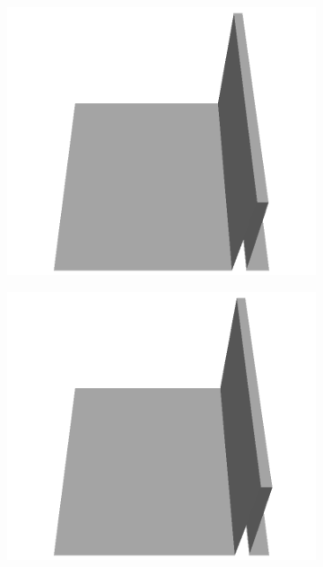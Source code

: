 \documentclass[../document.tex]{subfiles}
\begin{document}
\begin{figure}[H]
\begin{subfigure}[b]{0.065\textwidth}
    \includegraphics[width=\linewidth]{../img/5/custom_patches/walls_front/all/17-3d.png}
    \end{subfigure}
    \begin{subfigure}[b]{0.065\textwidth}
    \includegraphics[width=\linewidth]{../img/5/custom_patches/walls_front/all/16-3d.png}
    \end{subfigure}
    \begin{subfigure}[b]{0.065\textwidth}

\end{subfigure}
\end{figure}
\end{document}
